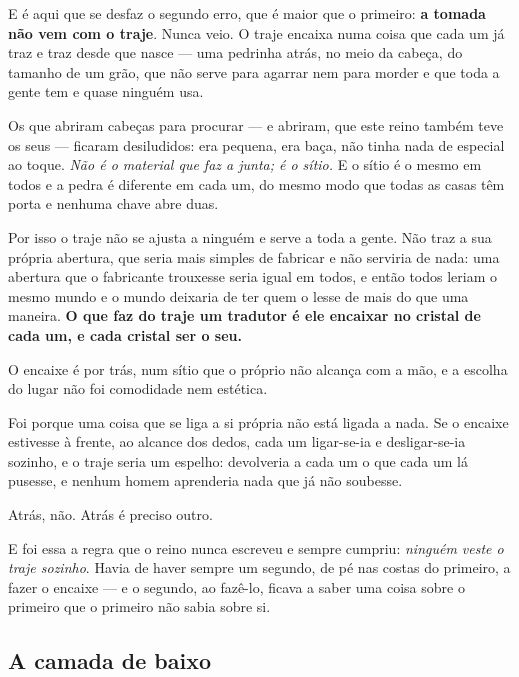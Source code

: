 \documentclass[livro.tex]{subfiles}
\begin{document}
E é aqui que se desfaz o segundo erro, que é maior que o primeiro: \textbf{a tomada não vem com o
traje}. Nunca veio. O traje encaixa numa coisa que cada um já traz e traz desde que nasce ---
uma pedrinha atrás, no meio da cabeça, do tamanho de um grão, que não serve para agarrar nem para
morder e que toda a gente tem e quase ninguém usa.

\medskip

Os que abriram cabeças para procurar --- e abriram, que este reino também teve os seus --- ficaram
desiludidos: era pequena, era baça, não tinha nada de especial ao toque. \emph{Não é o material
que faz a junta; é o sítio.} E o sítio é o mesmo em todos e a pedra é diferente em cada um, do
mesmo modo que todas as casas têm porta e nenhuma chave abre duas.

\medskip

Por isso o traje não se ajusta a ninguém e serve a toda a gente. Não traz a sua própria abertura,
que seria mais simples de fabricar e não serviria de nada: uma abertura que o fabricante trouxesse
seria igual em todos, e então todos leriam o mesmo mundo e o mundo deixaria de ter quem o lesse de
mais do que uma maneira. \textbf{O que faz do traje um tradutor é ele encaixar no cristal de cada
um, e cada cristal ser o seu.}

\medskip

O encaixe é por trás, num sítio que o próprio não alcança com a mão, e a escolha do lugar não foi
comodidade nem estética.

\medskip

Foi porque uma coisa que se liga a si própria não está ligada a nada. Se o encaixe estivesse à
frente, ao alcance dos dedos, cada um ligar-se-ia e desligar-se-ia sozinho, e o traje seria um
espelho: devolveria a cada um o que cada um lá pusesse, e nenhum homem aprenderia nada que já não
soubesse.

\medskip

Atrás, não. Atrás é preciso outro.

\medskip

E foi essa a regra que o reino nunca escreveu e sempre cumpriu: \emph{ninguém veste o traje
sozinho}. Havia de haver sempre um segundo, de pé nas costas do primeiro, a fazer o encaixe --- e
o segundo, ao fazê-lo, ficava a saber uma coisa sobre o primeiro que o primeiro não sabia sobre si.

\subsection*{A camada de baixo}
\end{document}
